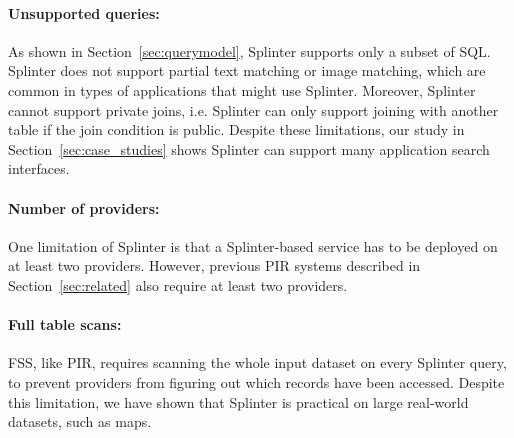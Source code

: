 \paragraph{Unsupported queries:}
As shown in Section~\ref{sec:querymodel}, Splinter supports only a subset of SQL.
Splinter does not support partial text matching or image matching, which are common in types of applications
that might use Splinter. Moreover, Splinter cannot support private joins, i.e. Splinter can only support joining with 
another table if the join condition is public. Despite these limitations, our study in Section~\ref{sec:case_studies} 
shows Splinter can support many application search interfaces.

\paragraph{Number of providers:} 
One limitation of Splinter is that 
a Splinter-based service has 
to be deployed on at least two providers. 
However, previous PIR systems described in Section~\ref{sec:related}
also require at least two providers. 



\paragraph{Full table scans:}
FSS, like PIR, requires scanning the whole input dataset on every Splinter query,
to prevent providers from figuring out which records have been accessed. 
Despite this limitation, we have shown that Splinter is practical
on large real-world datasets, such as maps.

